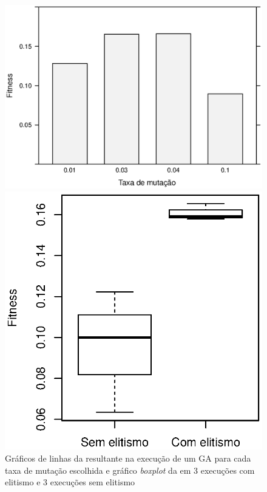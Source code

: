\begin{figure}[H]
    \centering
    \begin{minipage}{.47\textwidth}
        \includegraphics[width=\textwidth]{figures/mutation}
    \end{minipage}%
    \quad\quad\quad\quad
    \begin{minipage}{.35\textwidth}
        \includegraphics[width=\textwidth]{figures/elitism}
    \end{minipage}

    \caption{Gráficos de linhas da \fitness resultante na execução de um GA para cada taxa de mutação escolhida e gráfico \textit{boxplot} da \fitness em 3 execuções com elitismo e 3 execuções sem elitismo}
    \label{fig:mut-elite}
\end{figure}

